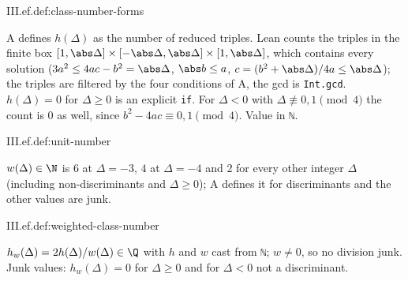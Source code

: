 \begin{definition}
\end{definition}
\begin{tfformal}{III.ef.def:class-number-forms}
\begin{tffidelity}
A defines $h(\Delta)$ as the number of reduced triples. Lean counts the triples in the finite box $[1,\abs\Delta]\times[-\abs\Delta,\abs\Delta]\times[1,\abs\Delta]$, which contains every solution ($3a^2\le4ac-b^2=\abs\Delta$, $\abs b\le a$, $c=(b^2+\abs\Delta)/4a\le\abs\Delta$); the triples are filtered by the four conditions of A, the gcd is \texttt{Int.gcd}. $h(\Delta)=0$ for $\Delta\ge0$ is an explicit \texttt{if}. For $\Delta<0$ with $\Delta\not\equiv0,1\pmod4$ the count is $0$ as well, since $b^2-4ac\equiv0,1\pmod4$. Value in \texttt{ℕ}.
\end{tffidelity}
\end{tfformal}

\begin{definition}
\end{definition}
\begin{tfformal}{III.ef.def:unit-number}
\begin{tffidelity}
$w(\Delta)\in\N$ is $6$ at $\Delta=-3$, $4$ at $\Delta=-4$ and $2$ for every other integer $\Delta$ (including non-discriminants and $\Delta\ge0$); A defines it for discriminants and the other values are junk.
\end{tffidelity}
\end{tfformal}

\begin{definition}
\end{definition}
\begin{tfformal}{III.ef.def:weighted-class-number}
\begin{tffidelity}
$h_w(\Delta)=2h(\Delta)/w(\Delta)\in\Q$ with $h$ and $w$ cast from \texttt{ℕ}; $w\ne0$, so no division junk. Junk values: $h_w(\Delta)=0$ for $\Delta\ge0$ and for $\Delta<0$ not a discriminant.
\end{tffidelity}
\end{tfformal}

